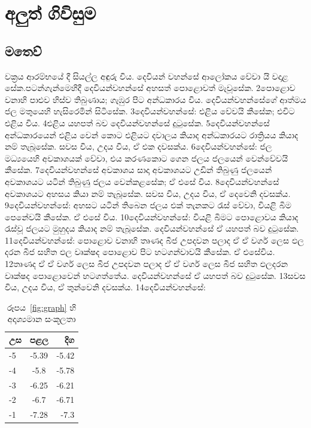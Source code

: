 \documentclass[10pt]{book}
\begin{document}
\part{අලුත් ගිවිසුම}           
\chapter{මතෙව්}                
වක්‍රය {ආරම්භයේ} දී සියල්ල අඳුරු විය. දෙවියන් වහන්සේ ආලෝකය වේවා යි වදාළ  සේක.පටන්ගැන්මෙහිදී දෙවියන්වහන්සේ අහසත් පොළොවත් මැවූසේක. 2පොළොව වනාහි පාළුව හිස්ව තිබුණාය; ගැඹුර පිට අන්ධකාරය විය. දෙවියන්වහන්සේගේ ආත්මය ජල මතුයෙහි හැසිරෙමින් සිටිසේක. 3දෙවියන්වහන්සේ: එළිය වේවයි කීසේක; එවිට එළිය විය. 4එළිය යහපත් බව දෙවියන්වහන්සේ දුටුසේක. 5දෙවියන්වහන්සේ අන්ධකාරයෙන් එළිය වෙන් කොට එළියට දවාලය කියාද අන්ධකාරයට රාත්‍රියය කියාද නම් තැබූසේක. සවස විය, උදය විය, ඒ එක දවසක්ය. 6දෙවියන්වහන්සේ: ජල මධ්‍යයෙහි අවකාශයක් වේවා, එය කරණකොට ගෙන ජලය ජලයෙන් වෙන්වේවයි කීසේක. 7දෙවියන්වහන්සේ අවකාශය සාදා අවකාශයට උඩින් තිබුණු ජලයෙන් අවකාශයට යටින් තිබුණු ජලය වෙන්කළසේක; ඒ එසේ විය. 8දෙවියන්වහන්සේ අවකාශයට අහසය කියා නම් තැබූසේක. සවස විය, උදය විය, ඒ දෙවෙනි දවසක්ය. 9දෙවියන්වහන්සේ: අහසට යටින් තිබෙන ජලය එක් තැනකට රැස් වේවා, වියළි බිම පෙනේවයි කීසේක. ඒ එසේ විය. 10දෙවියන්වහන්සේ: වියළි බිමට පොළොවය කියාද රැස්වූ ජලයට මුහුදය කියාද නම් තැබූසේක. දෙවියන්වහන්සේ ඒ යහපත් බව දුටුසේක. 11දෙවියන්වහන්සේ: පොළොව වනාහි තෘණද බීජ උපදවන පලාද ඒ ඒ වර්ග ලෙස ඵල දරන බීජ සහිත ඵල වෘක්ෂද පොළොව පිට හටගන්වාවයි කීසේක. ඒ එසේවිය. 12තෘණද ඒ ඒ වර්ග ලෙස බීජ උපදවන පලාද ඒ ඒ වර්ග ලෙස බීජ සහිත ඵලදරන වෘක්ෂද පොළොවෙන් හටගත්තේය. දෙවියන්වහන්සේ ඒ යහපත් බව දුටුසේක. 13සවස විය, උදය විය, ඒ තුන්වෙනි දවසක්ය. 14දෙවියන්වහන්සේ: 


\begin{table}[!hbt]
\begin{center}
\caption{රූපය~\ref{fig:graph} හි අදෘශ්‍යමාන සංකූලතා}
\label{tab:data}
\begin{tabular}{|l|c|r|}
\hline
උස &  පළල & දිග \\
\hline
-5 & -5.39 & -5.42\\
-4 & -5.8 & -5.78\\
-3 & -6.25 & -6.21\\
-2 & -6.7 & -6.71\\
-1 & -7.28 & -7.3\\
\hline
\end{tabular}
\end{center}
\end{table}
\end{document}

